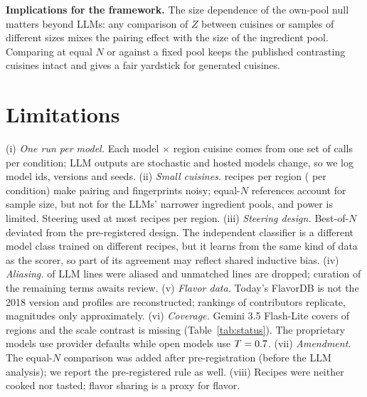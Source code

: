 \documentclass[conference]{IEEEtran}
\begin{document}
\textbf{Implications for the framework.} The size dependence of the own-pool null matters beyond LLMs: any comparison of $Z$ between cuisines or samples of different sizes mixes the pairing effect with the size of the ingredient pool. Comparing at equal $N$ or against a fixed pool keeps the published contrasting cuisines intact and gives a fair yardstick for generated cuisines.

\section{Limitations}
(i) \emph{One run per model.} Each model $\times$ region cuisine comes from one set of \NReplicates{} calls per condition; LLM outputs are stochastic and hosted models change, so we log model ids, versions and seeds. (ii) \emph{Small cuisines.} \NRecipesPerRegionModel{} recipes per region (\NRecipesPerCondition{} per condition) make pairing and fingerprints noisy; equal-$N$ references account for sample size, but not for the LLMs' narrower ingredient pools, and power is limited. Steering used at most \NBonSelectedMax{} recipes per region. (iii) \emph{Steering design.} Best-of-$N$ deviated from the pre-registered design. The independent classifier is a different model class trained on different recipes, but it learns from the same kind of data as the scorer, so part of its agreement may reflect shared inductive bias. (iv) \emph{Aliasing.} \NAliasMatchedRange{} of LLM lines were aliased and unmatched lines are dropped; curation of the remaining terms awaits review. (v) \emph{Flavor data.} Today's FlavorDB is not the 2018 version and \NMissingProfiles{} profiles are reconstructed; rankings of contributors replicate, magnitudes only approximately. (vi) \emph{Coverage.} Gemini 3.5 Flash-Lite covers \NGeminiRegions{} of \NRegions{} regions and the scale contrast is missing (Table~\ref{tab:status}). The proprietary models use provider defaults while open models use $T=0.7$. (vii) \emph{Amendment.} The equal-$N$ comparison was added after pre-registration (before the LLM analysis); we report the pre-registered rule as well. (viii) Recipes were neither cooked nor tasted; flavor sharing is a proxy for flavor.

\end{document}
